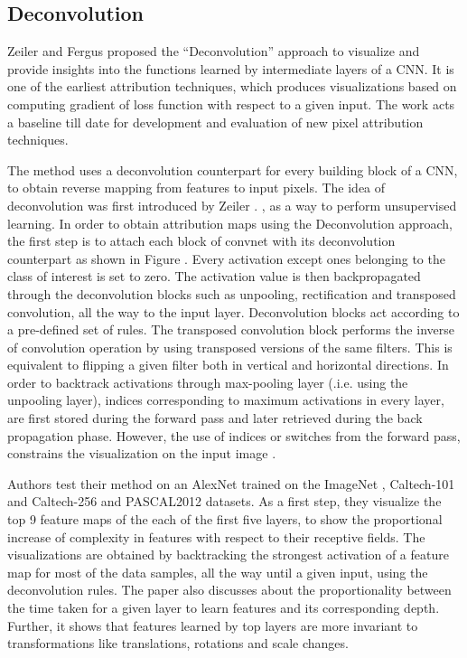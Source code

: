 \documentclass[../report.tex]{subfiles}
\begin{document}
    \subsection{Deconvolution}
    Zeiler and Fergus proposed the \enquote{Deconvolution}\cite{matthew2014visualizing} approach to visualize and provide insights into the functions learned by intermediate layers of a CNN. It is one of the earliest attribution techniques, which produces visualizations based on computing gradient of loss function with respect to a given input. The work acts a baseline till date for development and evaluation of new pixel attribution techniques.
    
  
    The method uses a deconvolution counterpart for every building block of a CNN, to obtain reverse mapping from features to input pixels. The idea of deconvolution was first introduced by Zeiler \etal. \cite{zeiler2011adaptive}, as a way to perform unsupervised learning. In order to obtain attribution maps using the Deconvolution approach, the first step is to attach each block of convnet with its deconvolution counterpart as shown in Figure \cite{fig_deconv}. Every activation except ones belonging to the class of interest is set to zero. The activation value is then backpropagated through the deconvolution blocks such as unpooling, rectification and transposed convolution, all the way to the input layer. Deconvolution blocks act according to a pre-defined set of rules. The transposed convolution block performs the inverse of convolution operation by using transposed versions of the same filters. This is equivalent to flipping a given filter both in vertical and horizontal directions. In order to backtrack activations through max-pooling layer (.i.e. using the unpooling layer), indices corresponding to maximum activations in every layer, are first stored during the forward pass and later retrieved during the back propagation phase. However, the use of indices or switches from the forward pass, constrains the visualization on the input image \cite {guided_backprop}.
    
     
    Authors test their method on an AlexNet \cite{krizhevsky2012imagenet} trained on the ImageNet \cite{krizhevsky2012imagenet}, Caltech-101 \cite{caltech_101} and Caltech-256 \cite{caltech_256} and PASCAL2012 \cite{pascal-voc-2012} datasets. As a first step, they visualize the top 9 feature maps of the each of the first five layers, to show the proportional increase of complexity in features with respect to their receptive fields. The visualizations are obtained by backtracking the strongest activation of a feature map for most of the data samples, all the way until a given input, using the deconvolution rules. The paper also discusses about the proportionality between the time taken for a given layer to learn features and its corresponding depth. Further, it shows that features learned by top layers are more invariant to transformations like translations, rotations and scale changes.
    
\end{document}
